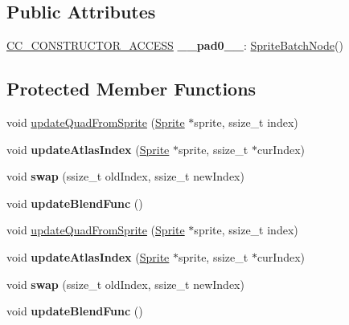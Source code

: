 \subsection*{Public Attributes}
\begin{DoxyCompactItemize}
\item 
\mbox{\label{classSpriteBatchNode_ae70d8a9b8d67c08387b727d81ec7ec51}} 
\hyperlink{_2cocos2d_2cocos_2base_2ccConfig_8h_a25ef1314f97c35a2ed3d029b0ead6da0}{C\+C\+\_\+\+C\+O\+N\+S\+T\+R\+U\+C\+T\+O\+R\+\_\+\+A\+C\+C\+E\+SS} {\bfseries \+\_\+\+\_\+pad0\+\_\+\+\_\+}\+: \hyperlink{classSpriteBatchNode}{Sprite\+Batch\+Node}()
\end{DoxyCompactItemize}
\subsection*{Protected Member Functions}
\begin{DoxyCompactItemize}
\item 
void \hyperlink{classSpriteBatchNode_a408788d1a225c2cb9787a4657d861b20}{update\+Quad\+From\+Sprite} (\hyperlink{classSprite}{Sprite} $\ast$sprite, ssize\+\_\+t index)
\item 
\mbox{\label{classSpriteBatchNode_a4e8462e43673ef5edb4459cc51804e06}} 
void {\bfseries update\+Atlas\+Index} (\hyperlink{classSprite}{Sprite} $\ast$sprite, ssize\+\_\+t $\ast$cur\+Index)
\item 
\mbox{\label{classSpriteBatchNode_a99f9486931a3ef5c5469986051a318aa}} 
void {\bfseries swap} (ssize\+\_\+t old\+Index, ssize\+\_\+t new\+Index)
\item 
\mbox{\label{classSpriteBatchNode_ad36c11cfa03268142885eaacf598bfbc}} 
void {\bfseries update\+Blend\+Func} ()
\item 
void \hyperlink{classSpriteBatchNode_a408788d1a225c2cb9787a4657d861b20}{update\+Quad\+From\+Sprite} (\hyperlink{classSprite}{Sprite} $\ast$sprite, ssize\+\_\+t index)
\item 
\mbox{\label{classSpriteBatchNode_a4e8462e43673ef5edb4459cc51804e06}} 
void {\bfseries update\+Atlas\+Index} (\hyperlink{classSprite}{Sprite} $\ast$sprite, ssize\+\_\+t $\ast$cur\+Index)
\item 
\mbox{\label{classSpriteBatchNode_a99f9486931a3ef5c5469986051a318aa}} 
void {\bfseries swap} (ssize\+\_\+t old\+Index, ssize\+\_\+t new\+Index)
\item 
\mbox{\label{classSpriteBatchNode_ad36c11cfa03268142885eaacf598bfbc}} 
void {\bfseries update\+Blend\+Func} ()
\end{DoxyCompactItemize}
